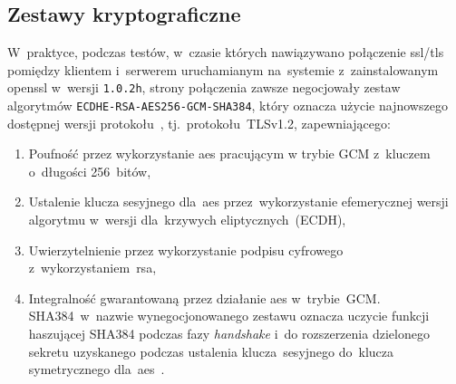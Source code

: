 \documentclass[thesis]{subfiles}
\begin{document}
\subsection{Zestawy kryptograficzne}

W~praktyce, podczas testów, w~czasie których nawiązywano połączenie \gls{ssl/tls} pomiędzy klientem i~serwerem uruchamianym na~systemie z~zainstalowanym \gls{openssl} w~wersji \texttt{1.0.2h}, strony połączenia zawsze negocjowały zestaw algorytmów \texttt{ECDHE-RSA-AES256-GCM-SHA384}, który oznacza użycie najnowszego dostępnej wersji protokołu~, tj.~protokołu~TLSv1.2, zapewniającego:
\begin{enumerate}
\item Poufność przez wykorzystanie \gls{aes} pracującym w trybie GCM z~kluczem o~długości 256~bitów,
\item Ustalenie klucza sesyjnego dla~\gls{aes} przez~wykorzystanie efemerycznej wersji algorytmu  w~wersji dla~krzywych eliptycznych~(ECDH),
\item Uwierzytelnienie przez wykorzystanie podpisu cyfrowego z~wykorzystaniem~\gls{rsa},
\item Integralność gwarantowaną przez działanie \gls{aes} w~trybie~GCM. SHA384~w~nazwie wynegocjonowanego zestawu oznacza uczycie funkcji haszującej SHA384 podczas fazy \emph{handshake} i~do rozszerzenia dzielonego sekretu uzyskanego podczas ustalenia klucza~sesyjnego do~klucza symetrycznego dla~\gls{aes}~\cite{stack:openssl-sha-gcm}.
\end{enumerate}
\end{document}
